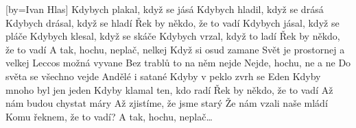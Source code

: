 [by={Ivan Hlas}]
\beginverse
Kdybych plakal, když se jásá
Kdybych hladil, když se drásá
Kdybych drásal, když se hladí
Řek by někdo, že to vadí
\endverse
\beginverse
Kdybych jásal, když se pláče
Kdybych klesal, když se skáče
Kdybych vrzal, když to ladí
Řek by někdo, že to vadí
\endverse
\beginref
A tak, hochu, neplač, nelkej
Když si osud zamane
Svět je prostornej a velkej
Leccos možná vyvane
Bez trablů to na něm nejde
Nejde, hochu, ne a ne
Do světa se všechno vejde
Andělé i satané
\endverse
\beginverse
Kdyby v peklo zvrh se Eden
Kdyby mnoho byl jen jeden
Kdyby klamal ten, kdo radí
Řek by někdo, že to vadí
\endverse
\beginverse
Až nám budou chystat máry
Až zjistíme, že jsme starý
Že nám vzali naše mládí
Komu řeknem, že to vadí?
\endverse
\beginref
A tak, hochu, neplač\ldots
\endverse
\endsong
